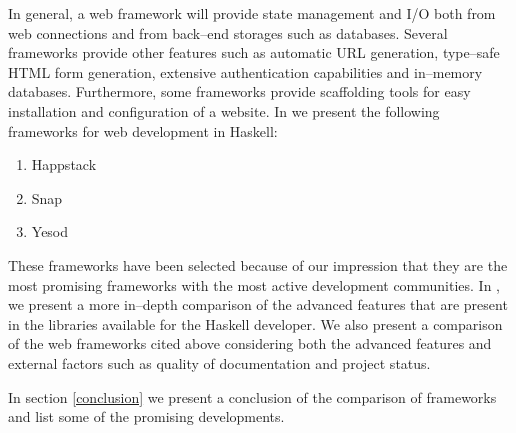 In general, a web framework will provide state management and I/O both from web connections and from back--end storages such as databases.
Several frameworks provide other features such as automatic URL generation, type--safe HTML form generation, extensive authentication capabilities and in--memory databases.
Furthermore, some frameworks provide scaffolding tools for easy installation and configuration of a website.
In  we present the following frameworks for web development in Haskell:
\begin{enumerate}
	\item Happstack
	\item Snap
	\item Yesod
\end{enumerate}
These frameworks have been selected because of our impression that they are the most promising frameworks with the most active development communities.
In , we present a more in--depth comparison of the advanced features that are present in the libraries available for the Haskell developer.
We also present a comparison of the web frameworks cited above considering both the advanced features and external factors such as quality of documentation and project status.

In section \ref{conclusion} we present a conclusion of the comparison of frameworks and list some of the promising developments.